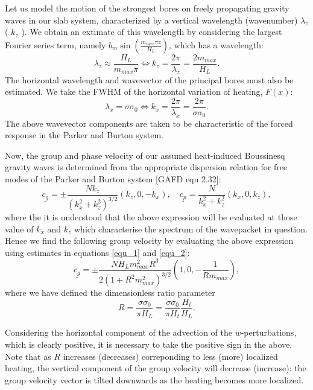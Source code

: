 \documentclass[12pt]{article}
\begin{document}
Let us model the motion of the strongest bores on freely propagating gravity waves in our slab system, characterized by a vertical wavelength (wavenumber) $\lambda_z$ ( $k_z$ ).
We obtain an extimate of this wavelength by considering the largest Fourier series term, namely $b_m \sin \left( \frac{ m_{max} \pi z }{ H_L}\right)$, which has a 
wavelength:
%
\begin{equation}
\label{equ_1}
\lambda_z \approx \frac{H_L}{m_{max} \pi } \iff k_z = \frac{2 \pi }{\lambda_z} = \frac{ 2 m_{max} }{ H_L }.
\end{equation}
%
The horizontal wavelength and wavevector of the principal bores must also be estimated. We take the FWHM of the horizontal variation of heating, $F(x)$:
%
\begin{equation}
\label{equ_2}
\lambda_x = \sigma \sigma_0 \iff k_x = \frac{2 \pi}{ \lambda_x} = \frac{2 \pi }{\sigma \sigma_0}.
\end{equation}
%
The above wavevector components are taken to be characteristic of the forced response in the Parker and Burton system. 

Now, the group and phase velocity of our assumed heat-induced Boussinesq gravity waves is determined from the appropriate dispersion relation for free modes of the 
Parker and Burton system [GAFD equ 2.32]:
%
\begin{equation}
\underline{c_g} = \pm \frac{N k_z}{( k_x^2 + k_z^2)^{3/2}} ( k_z,0,-k_x), \quad \underline{c_p} =   \frac{N }{k_x^2 + k_z^2} ( k_x,0,k_z),
\end{equation}
%
where the it is understood that the above expression will be evaluated at those value of $k_x$ and $k_z$ which characterise the spectrum of the wavepacket in question.
Hence we find the following group velocity by evaluating the above expression using estimates in equations \ref{equ_1} and \ref{equ_2}:
%
\begin{equation}
\underline{c_g} = \pm  \frac{ N  H_L m_{max}^2 R^3 }{2 (1 + R^2 m_{max}^2 )^{3/2}} \left( 1,0,-\frac{1}{R m_{max}}\right),
\end{equation}
%
where we have defined the dimensionless ratio parameter
%
\begin{equation}
R = \frac{\sigma \sigma_0}{ \pi H_L} = \frac{\sigma \sigma_0}{ \pi H_t} \frac{H_t}{H_L}.
\end{equation}
%

Considering the horizontal component of the advection of the $w$-perturbations, which is clearly positive, it is necessary to take the positive sign in the above.
Note that as $R$ increases (decreases) correponding to less (more) localized heating, the vertical component of the group velocity will decrease (increase): the group velocity vector is tilted 
downwards as the heating becomes more localized.    
\end{document}
